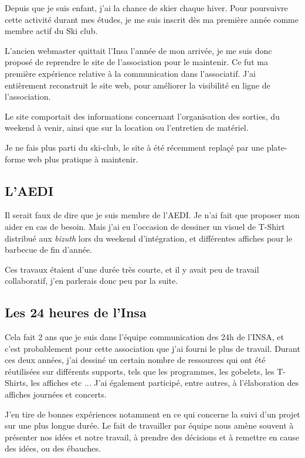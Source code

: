         Depuis que je suis enfant,  j'ai la chance de skier chaque hiver. Pour poursuivre cette activité durant mes études, je me suis inscrit dès ma première année comme membre actif du Ski club.
        
        L'ancien webmaster quittait l'Insa l'année de mon arrivée, je me suis donc proposé de reprendre le site de l'association pour le maintenir.
        Ce fut ma première expérience relative à la communication dans l'associatif.
        J'ai entièrement reconstruit le site web, pour améliorer la visibilité en ligne de l'association.
        
        Le site comportait des informations concernant l'organisation des sorties, du weekend à venir, ainsi que sur la location ou l'entretien de matériel.
        
        Je ne fais plus parti du ski-club, le site à été récemment replaçé par une plate-forme web plus pratique à maintenir. 
        
    \subsection{L'AEDI}
        
        Il serait faux de dire que je suis membre de l'AEDI. Je n'ai fait que proposer mon aider en cas de besoin.
        Mais j'ai eu l'occasion de dessiner un visuel de T-Shirt distribué aux \emph{bizuth} lors du weekend d'intégration, et différentes affiches pour le barbecue de fin d'année.
        
        Ces travaux étaient d'une durée très courte, et il y avait peu de travail collaboratif, j'en parlerais donc peu par la suite.
        
    \subsection{Les 24 heures de l'Insa}
        
        Cela fait 2 ans que je suis dans l'équipe communication des 24h de l'INSA, et c'est probablement pour cette association que j'ai fourni le plus de travail.
        Durant ces deux années,  j'ai dessiné un certain nombre de ressources qui ont été réutilisées sur différents supports, tels que les programmes, les gobelets, les T-Shirts, les affiches etc ...
        J'ai également participé, entre autres, à l'élaboration des affiches journées et concerts.
        
        J'en tire de bonnes expériences notamment en ce qui concerne la suivi d'un projet sur une plus longue durée.
        Le fait de travailler par équipe nous amène souvent à présenter nos idées et notre travail, à prendre des décisions et à remettre en cause des idées, ou des ébauches.
        
